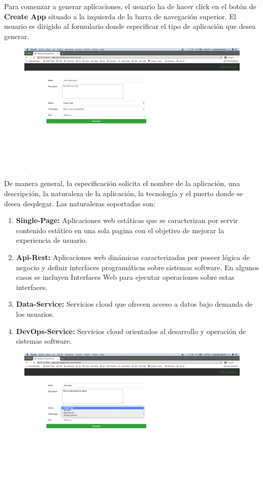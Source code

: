 \documentclass[a4paper,11pt]{book}
\begin{document}
Para comenzar a generar aplicaciones, el usuario ha de hacer click en el botón de \textbf{Create App} situado a la izquierda de la barra de navegación superior. El usuario es dirigido al formulario donde especificar el tipo de aplicación que desea generar. 

\begin{figure}[H]
\centering
\includegraphics[scale=0.2]{imagenes/casouso/5.png}
\caption{   }
\end{figure}

De manera general, la especificación solicita el nombre de la aplicación, una descripción, la naturaleza de la aplicación, la tecnología y el puerto donde se desea desplegar. Las naturalezas soportadas son:

\begin{enumerate}
\item \textbf{ Single-Page: } Aplicaciones web estáticas que se caracterizan por servir contenido estático en una sola pagina con el objetivo de mejorar la experiencia de usuario. 
\item \textbf{ Api-Rest: } Aplicaciones web dinámicas caracterizadas por poseer lógica de negocio y definir interfaces programáticas sobre sistemas software. En algunos casos se incluyen Interfaces Web para ejecutar operaciones sobre estas interfaces.  
\item \textbf{ Data-Service:} Servicios cloud que ofrecen acceso a datos bajo demanda de los usuarios. 
\item \textbf{ DevOps-Service: } Servicios cloud orientados al desarrollo y operación de sistemas software. 
\end{enumerate}

\begin{figure}[H]
\centering
\includegraphics[scale=0.2]{imagenes/casouso/6.png}
\caption{   }
\end{figure}
\end{document}
